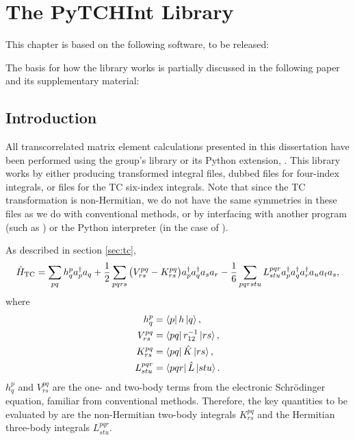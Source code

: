 \chapter{The PyTCHInt Library}
\label{chap:pytchint}

This chapter is based on the following software, to be released:\\

The basis for how the library works is partially discussed in the following paper and its supplementary material: \\

\section{Introduction}

All transcorrelated matrix element calculations presented in this dissertation have been performed using the group's \tchint library or its Python extension, \pytchint. This library works by either producing transformed integral files, dubbed \fcidump files for four-index integrals, or \tcdump files for the \gls{TC} six-index integrals. Note that since the \gls{TC} transformation is non-Hermitian, we do not have the same symmetries in these files as we do with conventional methods, or by interfacing with another program (such as \neci) or the Python interpreter (in the case of \pytchint).

As described in section \ref{sec:tc},
\begin{equation}
    \hat H_\mathrm{TC} = \sum_{pq} h_q^p a_p^\dagger a_q
    + \frac{1}{2} \sum_{pqrs} \big(V_{rs}^{pq} - K_{rs}^{pq}\big)
    a_p^\dagger a_q^\dagger a_s a_r
    - \frac{1}{6} \sum_{pqrstu} L_{stu}^{pqr}
    a_p^\dagger a_q^\dagger a_r^\dagger a_u a_t a_s,
\end{equation}
where
\begin{equation}
\begin{split}
    h_q^p &= \bra{p}h\ket{q}, \\
    V_{rs}^{pq} &= \bra{p q } r_{12}^{-1} \ket{ r s}, \\
    K_{rs}^{pq} &= \bra{p q } \hat{K} \ket{ r s}, \\
    L_{stu}^{pqr} &= \bra{p q r } \hat{L} \ket{s t u}.
\end{split}
\end{equation}
$h_q^p$ and $V_{rs}^{pq}$ are the one- and two-body terms from the electronic Schr\"odinger equation, familiar from conventional methods. Therefore, the key quantities to be evaluated by \tchint are the non-Hermitian two-body integrals $K_{rs}^{pq}$ and the Hermitian three-body integrals $L_{stu}^{pqr}$.


